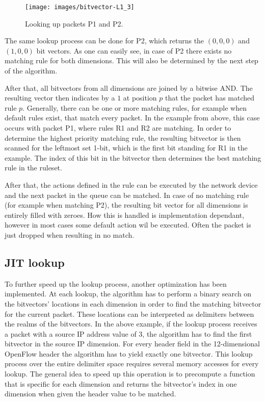 \documentclass[a4paper,
		12pt,
		parskip=full,
		titlepage
		]{scrartcl}
\begin{document}
\begin{figure}
\centering
\texttt{[image: images/bitvector-L1\_3]}
\caption{Looking up packets P1 and P2.}
\label{fig:bv-lookup}
\end{figure}

The same lookup process can be done for P2, which returns the $(0, 0, 0)$ and $(1, 0, 0)$ bit vectors.
As one can easily see, in case of P2 there exists no matching rule for both dimensions.
This will also be determined by the next step of the algorithm.

After that, all bitvectors from all dimensions are joined by a bitwise AND.
The resulting vector then indicates by a $1$ at position $p$ that the packet has matched rule $p$.
Generally, there can be one or more matching rules, for example when default rules exist, that match every packet.
In the example from above, this case occurs with packet P1, where rules R1 and R2 are matching.
In order to determine the highest priority matching rule, the resulting bitvector is then scanned for the leftmost set 1-bit, which is the first bit standing for R1 in the example.
The index of this bit in the bitvector then determines the best matching rule in the ruleset.

After that, the actions defined in the rule can be executed by the network device and the next packet in the queue can be matched.
In case of no matching rule (for example when matching P2), the resulting bit vector for all dimensions is entirely filled with zeroes.
How this is handled is implementation dependant, however in most cases some default action wil be executed.
Often the packet is just dropped when resulting in no match.

\subsection{JIT lookup}
To further speed up the lookup process, another optimization has been implemented.
At each lookup, the algorithm has to perform a binary search on the bitvectors' locations in each dimension in order to find the matching bitvector for the current packet.
These locations can be interpreted as delimiters between the realms of the bitvectors.
In the above example, if the lookup process receives a packet with a source IP address value of 3, the algorithm has to find the first bitvector in the source IP dimension. %
For every header field in the 12-dimensional OpenFlow header the algorithm has to yield exactly one bitvector.
This lookup process over the entire delimiter space requires several memory accesses for every lookup.
The general idea to speed up this operation is to precompute a function that is specific for each dimension and returns the bitvector's index in one dimension when given the header value to be matched.
\end{document}
